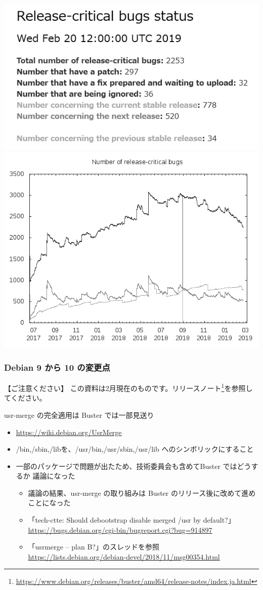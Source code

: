 \documentclass[mingoth,a4paper]{jsarticle}
\begin{document}
\begin{center}
  \includegraphics[width=0.45\hsize]{image201902/debian-rcbug-1_20190220_gray.png}
  \includegraphics[width=0.45\hsize]{image201902/debian-rcbug-2_20190220_gray.png}
\end{center}




\subsubsection{Debian 9 から 10 の変更点}


【ご注意ください】
この資料は2月現在のものです。リリースノート\footnote{\url{https://www.debian.org/releases/buster/amd64/release-notes/index.ja.html}}を参照してください。


usr-merge の完全適用は Buster では一部見送り

\begin{itemize}
\item \url{https://wiki.debian.org/UsrMerge}
\item /bin,/sbin,/libを、/usr/bin,/usr/sbin,/usr/lib へのシンボリックにすること
\item 一部のパッケージで問題が出たため、技術委員会も含めてBuster ではどうするか 議論になった
  \begin{itemize}
  \item 議論の結果、usr-merge の取り組みは Buster のリリース後に改めて進めことになった
  \item 「tech-ctte: Should debootstrap disable merged /usr by default?」 \url{https://bugs.debian.org/cgi-bin/bugreport.cgi?bug=914897}
  \item 「usrmerge -- plan B?」のスレッドを参照 \url{https://lists.debian.org/debian-devel/2018/11/msg00354.html}
  \end{itemize}
\end{itemize}
\end{document}
